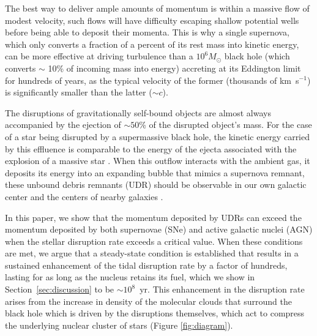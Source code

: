 \documentclass[preprint2]{aastex}
\begin{document}
The best way to deliver ample amounts of momentum is within a massive flow of modest velocity, such flows will have difficulty escaping shallow potential wells before being able to deposit their momenta. This is why a single supernova, which only converts a fraction of a percent of its rest mass into kinetic energy, can be more effective at driving turbulence than a $10^{6} M_{\odot}$ black hole (which converts $\sim$ 10\% of incoming mass into energy) accreting at its Eddington limit for hundreds of years, as the typical velocity of the former (thousands of km~s$^{-1}$) is significantly smaller than the latter ($\sim c$).

The disruptions of gravitationally self-bound objects are almost always accompanied by the ejection of $\sim 50$\% of the disrupted object's mass. For the case of a star being disrupted by a supermassive black hole, the kinetic energy carried by this effluence is comparable to the energy of the ejecta associated with the explosion of a massive star \citep[on average a factor of $\sim 5$ times smaller,][]{Guillochon:2016b}. When this outflow interacts with the ambient gas, it deposits its energy into an expanding bubble that mimics a supernova remnant, these unbound debris remnants (UDR) should be observable in our own galactic center and the centers of nearby galaxies \citep{Khokhlov:1996a,Guillochon:2016b,Chen:2016b,Romero-Canizales:2016a}.

In this paper, we show that the momentum deposited by UDRs can exceed the momentum deposited by both supernovae (SNe) and active galactic nuclei (AGN) when the stellar disruption rate exceeds a critical value. When these conditions are met, we argue that a steady-state condition is established that results in a sustained enhancement of the tidal disruption rate by a factor of hundreds, lasting for as long as the nucleus retains its fuel, which we show in Section~\ref{sec:discussion} to be $\sim 10^{8}$~yr. This enhancement in the disruption rate arises from the increase in density of the molecular clouds that surround the black hole which is driven by the disruptions themselves, which act to compress the underlying nuclear cluster of stars (Figure \ref{fig:diagram}).
\end{document}
